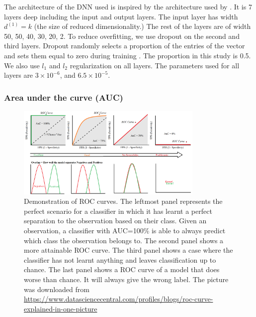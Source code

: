 \documentclass{article}
\begin{document}
The architecture of the DNN used is inspired by the architecture used by \cite{montanez}. It is 7 layers deep including the input and output layers. The input layer has width $d^{(1)}=k$ (the size of reduced dimensionality.) The rest of the layers are of width 50, 50, 40, 30, 20, 2. To reduce overfitting, we use dropout on the second and third layers. Dropout randomly selects a proportion of the entries of the vector and sets them equal to zero during training \cite{dropout}. The proportion in this study is 0.5. We also use $l_1$ and $l_2$ regularization on all layers. The parameters used for all layers are $3 \times 10^{-6}$, and $6.5 \times 10^{-5}.$
 
\subsubsection{Area under the curve (AUC)}
\begin{figure}[t]
    \centering
    \includegraphics[width=0.8\textwidth]{imgs/roc.png}
    \caption{Demonstration of ROC curves. The leftmost panel represents the perfect scenario for a classifier in which it has learnt a perfect separation to the observation based on their class. Given an observation, a classifier with AUC=100\% is able to always predict which class the observation belongs to. The second panel shows a more attainable ROC curve. The third panel shows a case where the classifier has not learnt anything and leaves classification up to chance. The last panel shows a ROC curve of a model that does worse than chance. It will always give the wrong label. The picture was downloaded from \url{https://www.datasciencecentral.com/profiles/blogs/roc-curve-explained-in-one-picture}}
    \label{fig:roc}
\end{figure}
\end{document}
